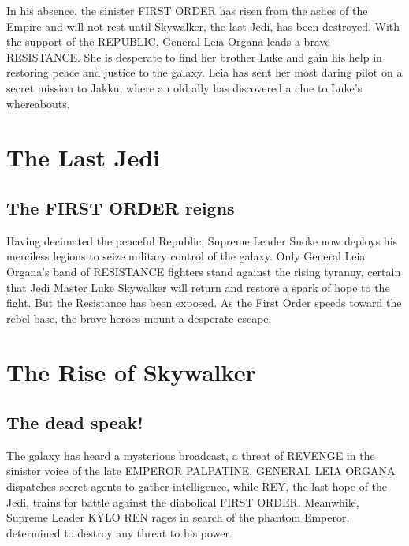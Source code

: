 \documentclass[oneside]{ifgw}
\begin{document}
In his absence, the sinister FIRST ORDER has risen from the ashes of the Empire and will not rest until Skywalker, the last Jedi, has been destroyed. With the support of the REPUBLIC, General Leia Organa leads a brave RESISTANCE. She is desperate to find her brother Luke and gain his help in restoring peace and justice to the galaxy. Leia has sent her most daring pilot on a secret mission to Jakku, where an old ally has discovered a clue to Luke's whereabouts.

\lipsum[1-10]


\chapter{The Last Jedi}
\section{The FIRST ORDER reigns}

Having decimated the peaceful Republic, Supreme Leader Snoke now deploys his merciless legions to seize military control of the galaxy. Only General Leia Organa's band of RESISTANCE fighters stand against the rising tyranny, certain that Jedi Master Luke Skywalker will return and restore a spark of hope to the fight. But the Resistance has been exposed. As the First Order speeds toward the rebel base, the brave heroes mount a desperate escape.

\lipsum[1-10]


\chapter{The Rise of Skywalker}

\section{The dead speak!}

The galaxy has heard a mysterious broadcast, a threat of REVENGE in the sinister voice of the late EMPEROR PALPATINE. GENERAL LEIA ORGANA dispatches secret agents to gather intelligence, while REY, the last hope of the Jedi, trains for battle against the diabolical FIRST ORDER. Meanwhile, Supreme Leader KYLO REN rages in search of the phantom Emperor, determined to destroy any threat to his power.

\lipsum[1-20]
\end{document}
